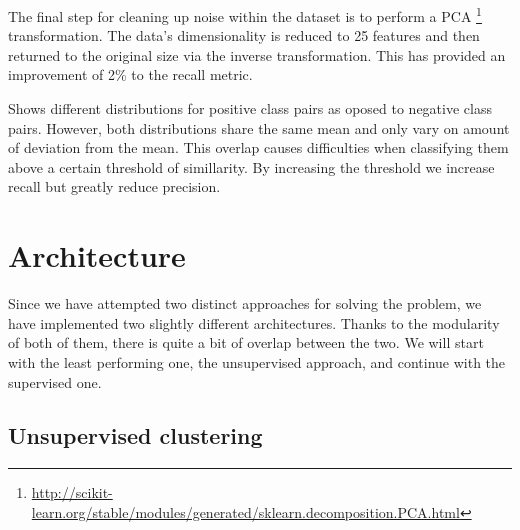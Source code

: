 The final step for cleaning up noise within the dataset is to perform a PCA
\footnote{\url{http://scikit-learn.org/stable/modules/generated/sklearn.decomposition.PCA.html}}
transformation. The data's dimensionality is reduced to 25 features and then returned
to the original size via the inverse transformation. This has provided an
improvement of 2\% to the recall metric.

 Shows different distributions for positive class pairs
as oposed to negative class pairs. However, both distributions share the same mean
and only vary on amount of deviation from the mean. This overlap causes
difficulties when classifying them above a certain threshold of simillarity. By
increasing the threshold we increase recall but greatly reduce precision.

\section {Architecture}
\label{section:architecture}

Since we have attempted two distinct approaches for solving the problem, we have
implemented two slightly different architectures. Thanks to the modularity of
both of them, there is quite a bit of overlap between the two. We will start
with the least performing one, the unsupervised approach, and continue
with the supervised one.

\subsection {Unsupervised clustering}
\label{sub-sec:unsupervised-clustering}

